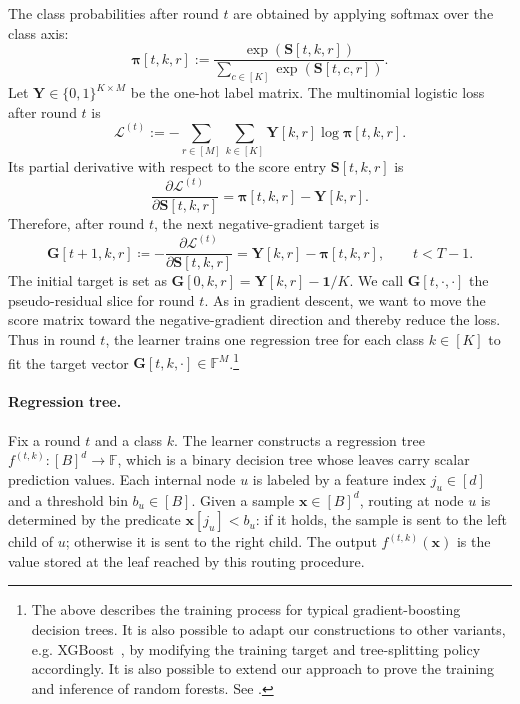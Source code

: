 The class probabilities after round $t$ are obtained by applying softmax over
the class axis:
\begin{equation}
\boldsymbol{\pi}[t,k,r]
:=
\frac{\exp(\mathbf{S}[t,k,r])}
{\sum_{c\in[K]} \exp(\mathbf{S}[t,c,r])}.
\end{equation}
Let $\mathbf{Y}\in\{0,1\}^{K\times M}$ be the one-hot label matrix. The
multinomial logistic loss after round $t$ is
\begin{equation}
\mathcal{L}^{(t)}
:=
-\sum_{r\in[M]}\sum_{k\in[K]}
\mathbf{Y}[k,r]\log \boldsymbol{\pi}[t,k,r].
\end{equation}
Its partial derivative with respect to the score entry
$\mathbf{S}[t,k,r]$ is
\begin{equation}
\frac{\partial \mathcal{L}^{(t)}}{\partial \mathbf{S}[t,k,r]}
=
\boldsymbol{\pi}[t,k,r]-\mathbf{Y}[k,r].
\end{equation}
Therefore, after round $t$, the next negative-gradient target is
\begin{equation}\label{eq:plain-pseudoresidual}
\mathbf{G}[t+1,k,r]
\coloneqq
-\frac{\partial \mathcal{L}^{(t)}}{\partial \mathbf{S}[t,k,r]}
=
\mathbf{Y}[k,r]-\boldsymbol{\pi}[t,k,r],
\qquad t<T-1.
\end{equation}
The initial target is set as $\mathbf{G}[0,k,r]=\mathbf{Y}[k,r] - \mathbf{1}/K$. We call
$\mathbf{G}[t,\cdot,\cdot]$ the pseudo-residual slice for round $t$. As in gradient descent,
we want to move the score matrix toward the negative-gradient direction and thereby reduce the loss.
Thus in round $t$, the
learner trains one regression tree for each class $k\in[K]$ to fit the target
vector $\mathbf{G}[t,k,\cdot]\in\mathbb{F}^{M}$.\footnote{The above describes the training process for typical gradient-boosting decision trees. 
It is also possible to adapt our constructions to other variants,
e.g. XGBoost~\cite{xgboost16},
by modifying the training target and tree-splitting policy accordingly.
It is also possible to extend our approach to prove
the training and inference of random forests.
See .}

\paragraph{Regression tree.}
Fix a round $t$ and a class $k$. The learner constructs a regression tree
$f^{(t,k)}:[B]^d\to\mathbb{F}$, which is a binary decision tree whose leaves
carry scalar prediction values. Each internal node $u$ is labeled by a feature
index $j_u\in[d]$ and a threshold bin $b_u\in[B]$. Given a sample
$\mathbf{x}\in[B]^d$, routing at node $u$ is determined by the predicate
$\mathbf{x}[j_u] < b_u$: if it holds, the sample is sent to the left child of
$u$; otherwise it is sent to the right child. The output
$f^{(t,k)}(\mathbf{x})$ is the value stored at the leaf reached by this routing
procedure.

